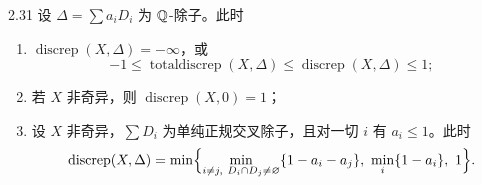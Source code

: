 \begin{corollaryp}{2.31}
设 $\Delta=\sum a_iD_i$ 为 $\mathbb{Q}$-除子。此时
\begin{enumerate}[label=（\arabic*）,leftmargin=2.6em,itemsep=1pt]
\item $\operatorname{discrep}(X,\Delta)=-\infty$，或
\[
-1\le\operatorname{totaldiscrep}(X,\Delta)\le\operatorname{discrep}(X,\Delta)\le1;
\]
\item 若 $X$ 非奇异，则 $\operatorname{discrep}(X,0)=1$；
\item 设 $X$ 非奇异，$\sum D_i$ 为单纯正规交叉除子，且对一切 $i$ 有 $a_i\le1$。此时
\[
\operatorname{discrep}(X,\Delta)=\min\Bigl\{\min_{i\ne j,\ D_i\cap D_j\ne\varnothing}\{1-a_i-a_j\},\ \min_i\{1-a_i\},\ 1\Bigr\}.
\]
\end{enumerate}
\end{corollaryp}
